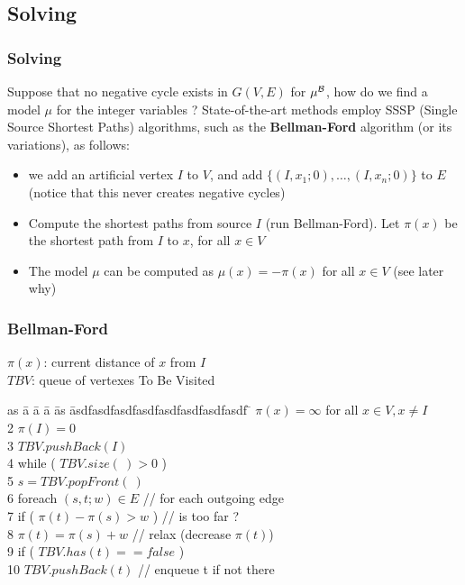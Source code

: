 \subsection{Solving}

\begin{frame}
  \frametitle{Solving}

  Suppose that no negative cycle exists in $G(V,E)$ for $\mu^{\mathcal{B}}$, 
  how do we find a model $\mu$ for the integer variables ?
  \vfill
  \pause
  State-of-the-art methods employ SSSP (Single Source Shortest Paths) algorithms,
  such as the {\bf Bellman-Ford} algorithm (or its variations), as follows:
  \begin{itemize}
    \item we add an artificial vertex $I$ to $V$, and add $\{ (I,x_1;0), \ldots, (I,x_n;0) \}$ to $E$
          (notice that this never creates negative cycles)
    \vfill

    \item Compute the shortest paths from source $I$ (run Bellman-Ford). Let $\pi(x)$ be the shortest path
          from $I$ to $x$, for all $x \in V$
    \vfill

    \item The model $\mu$ can be computed as $\mu(x) = -\pi(x)$ for all $x \in V$ (see later why)
  \end{itemize}

\end{frame}

\begin{frame}
  \frametitle{Bellman-Ford} 

  $\pi(x)$: current distance of $x$ from $I$\\
  $TBV$: queue of vertexes To Be Visited\\

  \begin{tabbing}
  as \= a \= a \= a \= as \= asdfasdfasdfasdfasdfasdfasdfasdf \=   \> $\pi(x) = \infty$ for all $x \in V, x \not= I$ \\
  2  \> $\pi(I) = 0$ \\
  3  \> $TBV.pushBack( I )$ \\
  4  \> while ( $TBV.size(\ ) > 0$ ) \\
  5  \> \> $s = TBV.popFront(\ )$ \\
  6  \> \> foreach $(s,t;w) \in E$         \> \> \> \> // for each outgoing edge \\
  7  \> \> \> if ( $\pi(t) - \pi(s) > w$ )    \> \> \> // is too far ? \\
  8  \> \> \> \> $\pi(t) = \pi(s) + w$           \> \> // relax (decrease $\pi(t)$) \\
  9  \> \> \> \> if ( $TBV.has( t ) == false$ ) \\ 
  10 \> \> \> \> \> $TBV.pushBack( t )$             \> // enqueue t if not there \\
  \end{tabbing}

\end{frame}

